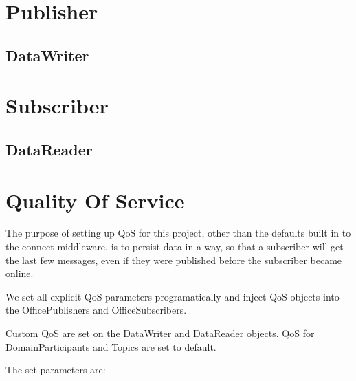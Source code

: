 \section{Publisher}
\subsection{DataWriter}

\section{Subscriber}
\subsection{DataReader}


\section{Quality Of Service}
The purpose of setting up QoS for this project, other than the defaults built in to the connect middleware, is to persist data in a way, so that a subscriber will get the last few messages, even if they were published before the subscriber became online.

We set all explicit QoS parameters programatically and inject QoS objects into the OfficePublishers and OfficeSubscribers. 

Custom QoS are set on the DataWriter and DataReader objects. QoS for DomainParticipants and Topics are set to default.

The set parameters are:

